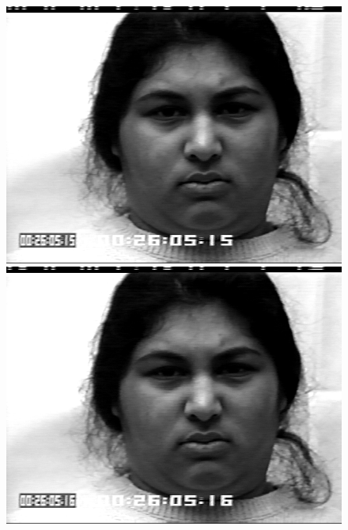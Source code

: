 \documentclass[12pt, a4paper]{report}
\begin{document}
\begin{figure}[h]
\begin{minipage}[b]{.2\linewidth}
		\includegraphics[width=\linewidth]{Bilder/Disgust3.png}
	\end{minipage}
	\hspace{.025\linewidth}%
	\begin{minipage}[b]{.2\linewidth} %
		\includegraphics[width=\linewidth]{Bilder/Disgust4.png}
	\end{minipage}
	\newline
	\begin{minipage}[b]{.2\linewidth} %

\end{minipage}
\end{figure}
\end{document}
